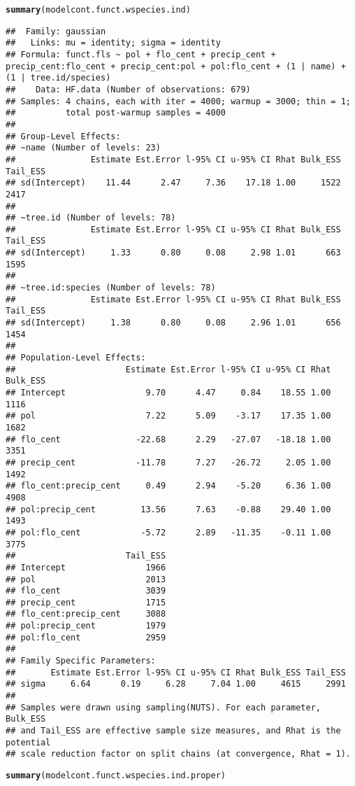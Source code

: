 \documentclass{article}\usepackage[]{graphicx}\usepackage[]{color}
\makeatletter
\newcommand{\hlstd}[1]{\textcolor[rgb]{0.345,0.345,0.345}{#1}}%
\newcommand{\hlkwd}[1]{\textcolor[rgb]{0.737,0.353,0.396}{\textbf{#1}}}%
\newenvironment{kframe}{%
 \def\at@end@of@kframe{}%
 \ifinner\ifhmode%
  \def\at@end@of@kframe{\end{minipage}}%
  \begin{minipage}{\columnwidth}%
 \fi\fi%
 \def\FrameCommand##1{\hskip\@totalleftmargin \hskip-\fboxsep
 \colorbox{shadecolor}{##1}\hskip-\fboxsep
     \hskip-\linewidth \hskip-\@totalleftmargin \hskip\columnwidth}%
 \MakeFramed {\advance\hsize-\width
   \@totalleftmargin\z@ \linewidth\hsize
   \@setminipage}}%
 {\par\unskip\endMakeFramed%
 \at@end@of@kframe}
\newenvironment{knitrout}{}{} %
\makeatother
\begin{document}
\begin{knitrout}
\begin{kframe}
\begin{alltt}
\hlkwd{summary}\hlstd{(modelcont.funct.wspecies.ind)}
\end{alltt}
\begin{verbatim}
##  Family: gaussian 
##   Links: mu = identity; sigma = identity 
## Formula: funct.fls ~ pol + flo_cent + precip_cent + precip_cent:flo_cent + precip_cent:pol + pol:flo_cent + (1 | name) + (1 | tree.id/species) 
##    Data: HF.data (Number of observations: 679) 
## Samples: 4 chains, each with iter = 4000; warmup = 3000; thin = 1;
##          total post-warmup samples = 4000
## 
## Group-Level Effects: 
## ~name (Number of levels: 23) 
##               Estimate Est.Error l-95% CI u-95% CI Rhat Bulk_ESS Tail_ESS
## sd(Intercept)    11.44      2.47     7.36    17.18 1.00     1522     2417
## 
## ~tree.id (Number of levels: 78) 
##               Estimate Est.Error l-95% CI u-95% CI Rhat Bulk_ESS Tail_ESS
## sd(Intercept)     1.33      0.80     0.08     2.98 1.01      663     1595
## 
## ~tree.id:species (Number of levels: 78) 
##               Estimate Est.Error l-95% CI u-95% CI Rhat Bulk_ESS Tail_ESS
## sd(Intercept)     1.38      0.80     0.08     2.96 1.01      656     1454
## 
## Population-Level Effects: 
##                      Estimate Est.Error l-95% CI u-95% CI Rhat Bulk_ESS
## Intercept                9.70      4.47     0.84    18.55 1.00     1116
## pol                      7.22      5.09    -3.17    17.35 1.00     1682
## flo_cent               -22.68      2.29   -27.07   -18.18 1.00     3351
## precip_cent            -11.78      7.27   -26.72     2.05 1.00     1492
## flo_cent:precip_cent     0.49      2.94    -5.20     6.36 1.00     4908
## pol:precip_cent         13.56      7.63    -0.88    29.40 1.00     1493
## pol:flo_cent            -5.72      2.89   -11.35    -0.11 1.00     3775
##                      Tail_ESS
## Intercept                1966
## pol                      2013
## flo_cent                 3039
## precip_cent              1715
## flo_cent:precip_cent     3088
## pol:precip_cent          1979
## pol:flo_cent             2959
## 
## Family Specific Parameters: 
##       Estimate Est.Error l-95% CI u-95% CI Rhat Bulk_ESS Tail_ESS
## sigma     6.64      0.19     6.28     7.04 1.00     4615     2991
## 
## Samples were drawn using sampling(NUTS). For each parameter, Bulk_ESS
## and Tail_ESS are effective sample size measures, and Rhat is the potential
## scale reduction factor on split chains (at convergence, Rhat = 1).
\end{verbatim}
\begin{alltt}
\hlkwd{summary}\hlstd{(modelcont.funct.wspecies.ind.proper)}

\end{alltt}
\end{kframe}
\end{knitrout}
\end{document}
